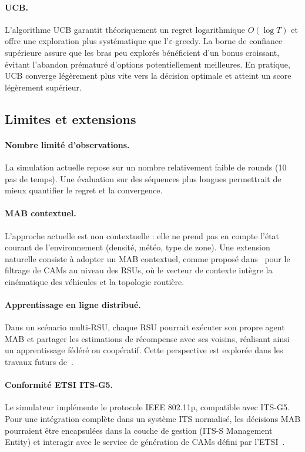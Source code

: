 \documentclass[12pt,a4paper]{article}
\begin{document}
\paragraph{UCB.}
L'algorithme UCB garantit théoriquement un regret logarithmique $O(\log T)$ et
offre une exploration plus systématique que l'$\varepsilon$-greedy. La borne de
confiance supérieure assure que les bras peu explorés bénéficient d'un bonus
croissant, évitant l'abandon prématuré d'options potentiellement meilleures. En
pratique, UCB converge légèrement plus vite vers la décision optimale et atteint
un score légèrement supérieur.

\subsection{Limites et extensions}

\paragraph{Nombre limité d'observations.}
La simulation actuelle repose sur un nombre relativement faible de rounds (10
pas de temps). Une évaluation sur des séquences plus longues permettrait de mieux
quantifier le regret et la convergence.

\paragraph{MAB contextuel.}
L'approche actuelle est non contextuelle : elle ne prend pas en compte l'état
courant de l'environnement (densité, météo, type de zone). Une extension naturelle
consiste à adopter un MAB contextuel, comme proposé dans~\cite{bouriga2026} pour
le filtrage de CAMs au niveau des RSUs, où le vecteur de contexte intègre la
cinématique des véhicules et la topologie routière.

\paragraph{Apprentissage en ligne distribué.}
Dans un scénario multi-RSU, chaque RSU pourrait exécuter son propre agent MAB
et partager les estimations de récompense avec ses voisins, réalisant ainsi un
apprentissage fédéré ou coopératif. Cette perspective est explorée dans les
travaux futurs de~\cite{bouriga2026}.

\paragraph{Conformité ETSI ITS-G5.}
Le simulateur implémente le protocole IEEE 802.11p, compatible avec ITS-G5. Pour
une intégration complète dans un système ITS normalisé, les décisions MAB pourraient
être encapsulées dans la couche de gestion (ITS-S Management Entity) et interagir
avec le service de génération de CAMs défini par l'ETSI~\cite{etsi_cam}.
\end{document}
